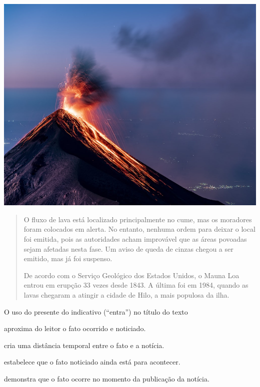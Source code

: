 \begin{minipage}{.5\textwidth}
\includegraphics[width=\textwidth]{./imgs/img9.jpg}
\end{minipage}
\begin{minipage}{.5\textwidth}
\begin{quote}
O fluxo de lava está localizado principalmente no cume, mas os moradores foram colocados em alerta. No entanto, nenhuma ordem para deixar o local foi emitida, pois as autoridades acham improvável que as áreas povoadas sejam afetadas nesta fase. Um aviso de queda de cinzas chegou a ser emitido, mas já foi suspenso.

De acordo com o Serviço Geológico dos Estados Unidos, o Mauna Loa entrou em erupção 33 vezes desde 1843. A última foi em 1984, quando as lavas chegaram a atingir a cidade de Hilo, a mais populosa da ilha.

\end{quote}
\end{minipage}

\pagebreak
\noindent{}O uso do presente do indicativo (“entra”) no título do texto

\begin{escolha}
\item aproxima do leitor o fato ocorrido e noticiado.

\item cria uma distância temporal entre o fato e a notícia.

\item estabelece que o fato noticiado ainda está para acontecer.

\item demonstra que o fato ocorre no momento da publicação da notícia.
\end{escolha}

